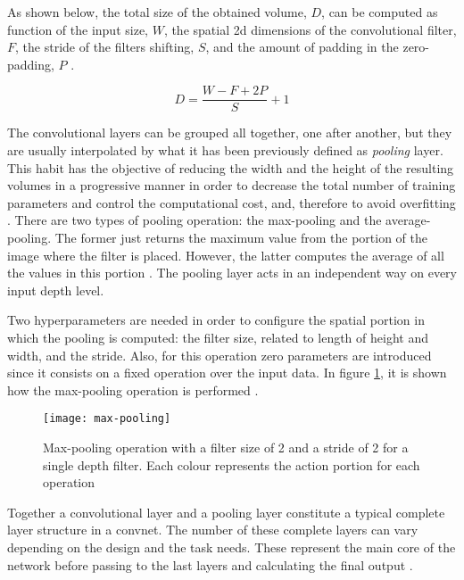 	As shown below, the total size of the obtained volume, $D$, can be computed as function of the input size, $W$, the spatial 2\acrshort{d} dimensions of the convolutional filter, $F$, the stride of the filters shifting, $S$,  and the amount of padding in the zero-padding, $P$ \cite{Karpathy2016}. 
	
	\[ D = \frac{W - F + 2P}{S} + 1 \]
	
	The convolutional layers can be grouped all together, one after another, but they are usually interpolated by what it has been previously defined as \textit{pooling} layer. This habit has the objective of reducing the width and the height of the resulting volumes in a progressive manner in order to decrease the total number of training parameters and control the computational cost, and, therefore to avoid overfitting \cite{Karpathy2016} . There are two types of pooling operation: the max-pooling and the average-pooling. The former just returns the maximum value from the portion of the image where the filter is placed. However, the latter computes the average of all the values in this portion \cite{Saha2018}. The pooling layer acts in an independent way on every input depth level. 
	
	Two hyperparameters are needed in order to configure the spatial portion in which the pooling is computed: the  filter size, related to length of height and width, and the stride. Also, for this operation zero parameters are introduced since it consists on a fixed operation over the input data. In figure \ref{fig:mesh12}, it is shown how the max-pooling operation is performed \cite{Karpathy2016}. 
	
	\begin{figure}[ht]
		\centering
		\captionsetup{justification=centering}
		\texttt{[image: max-pooling]}
		\caption{Max-pooling operation with a filter size of 2 and a stride of 2 for a single depth filter. Each colour represents the action portion for each operation \cite{Karpathy2016}}
		\label{fig:mesh12}
	\end{figure}
	
	Together a convolutional layer and a pooling layer constitute a typical complete layer structure in a \acrlong{convnet}. The number of these complete layers can vary depending on the design and the task needs. These represent the main core of the network before passing to the last layers and calculating the final output \cite{Saha2018}.
	
